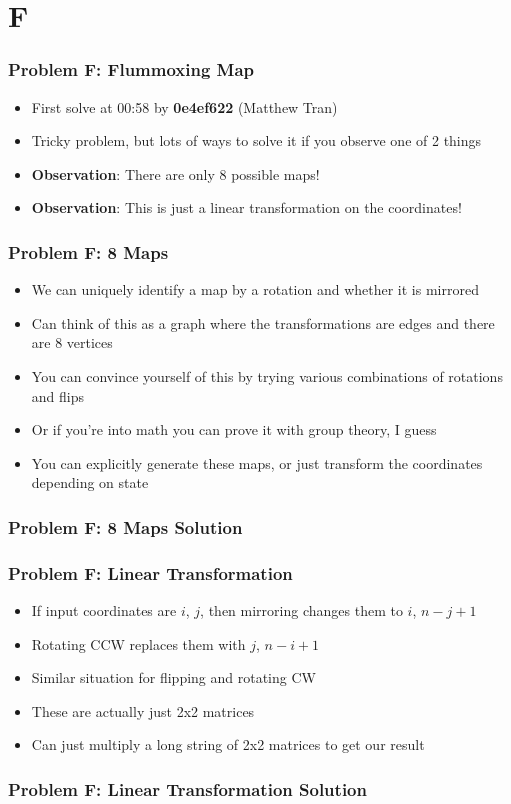 \section{F}%
\label{sec:f}

\begin{frame}
  \frametitle{Problem F: Flummoxing Map}

  \begin{itemize}
    \item First solve at 00:58 by \textbf{0e4ef622} (Matthew Tran)
    \item Tricky problem, but lots of ways to solve it if you observe one of 2 things
    \item \textbf{Observation}: There are only 8 possible maps!
    \item \textbf{Observation}: This is just a linear transformation on the coordinates!
  \end{itemize}

\end{frame}

\begin{frame}
  \frametitle{Problem F: 8 Maps}
  \begin{itemize}
    \item We can uniquely identify a map by a rotation and whether it is mirrored
    \item Can think of this as a graph where the transformations are edges and there are 8 vertices
    \item You can convince yourself of this by trying various combinations of rotations and flips
    \item Or if you're into math you can prove it with group theory, I guess
    \item You can explicitly generate these maps, or just transform the coordinates depending on state
  \end{itemize}
\end{frame}

\begin{frame}
  \frametitle{Problem F: 8 Maps Solution}
\end{frame}

\begin{frame}
  \frametitle{Problem F: Linear Transformation}
  \begin{itemize}
    \item If input coordinates are $i$, $j$, then mirroring changes them to $i$, $n-j+1$
    \item Rotating CCW replaces them with $j$, $n-i+1$
    \item Similar situation for flipping and rotating CW
    \item These are actually just 2x2 matrices
    \item Can just multiply a long string of 2x2 matrices to get our result
  \end{itemize}
\end{frame}

\begin{frame}
  \frametitle{Problem F: Linear Transformation Solution}
\end{frame}
